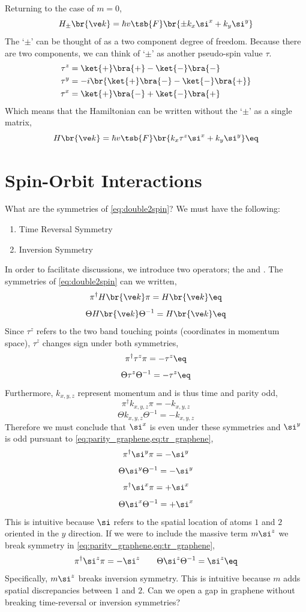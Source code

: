 \documentclass{article}
\begin{document}
Returning to the case of $m=0$,
\[ H_{\pm}\br{\ve k} =\hbar v\tsb{F} \br{\pm k_x \si^x + k_y \si^{y}} \]
The `$\pm$' can be thought of as a two component degree of freedom. Because there are two components, we can think of `$\pm$' as another pseudo-spin value $\tau$.
\begin{align*}
    \tau^{z} &= \ket{+} \bra{+} - \ket{-}\bra{-} \\
    \tau^{y} &= -i\br{\ket{+} \bra{-} - \ket{-}\bra{+}} \\
    \tau^{x} &= \ket{+} \bra{-} + \ket{-}\bra{+}
\end{align*}
Which means that the Hamiltonian can be written without the `$\pm$' as a single matrix,
\[ H\br{\ve k} =\hbar v\tsb{F} \br{k_x \tau^{z} \si^x + k_y \si^{y}} \eq \label{eq:double2spin}\]
\section{Spin-Orbit Interactions}
What are the symmetries of \cref{eq:double2spin}? We must have the following:
\begin{enumerate}
    \item Time Reversal Symmetry
    \item Inversion Symmetry
\end{enumerate}
In order to facilitate discussions, we introduce two operators; the  and . The symmetries of \cref{eq:double2spin} can we written,
\[  \pi^{\dagger} H\br{\ve k} \pi = H\br{\ve k} \eq \label{eq:parity_graphene}\]
\[  \Theta H\br{\ve k} \Theta^{-1} = H\br{\ve k} \eq \label{eq:tr_graphene}\]
Since $\tau^{z}$ refers to the two band touching points (coordinates in momentum space), $\tau^{z}$ changes sign under both symmetries,
\[ \pi^{\dagger} \tau^{z} \pi = - \tau^{z} \eq \label{eq:tau_z_sym_parity}\]
\[ \Theta \tau^{z} \Theta^{-1} = - \tau^{z} \eq \label{eq:tau_z_sym_tr}\]
Furthermore, $k_{x, y, z}$ represent momentum and is thus time and parity odd,
\[ \pi^{\dagger} k_{x,y,z} \pi = - k_{x,y,z} \]
\[ \Theta k_{x,y,z} \Theta^{-1} = - k_{x,y,z} \]
Therefore we must conclude that $\si^{x}$ is even under these symmetries and $\si^{y}$ is odd pursuant to \cref{eq:parity_graphene,eq:tr_graphene},
\[ \pi^{\dagger} \si^{y} \pi = - \si^{y} \]
\[ \Theta \si^{y} \Theta^{-1} = - \si^{y} \]
\[ \pi^{\dagger} \si^{x} \pi = + \si^{x} \]
\[ \Theta \si^{x} \Theta^{-1} = + \si^{x} \]
This is intuitive because $\si$ refers to the spatial location of atoms $1$ and $2$ oriented in the $y$ direction.
If we were to include the massive term $m\si^{z}$ we break symmetry in \cref{eq:parity_graphene,eq:tr_graphene},
\[ \pi^{\dagger} \si^{z} \pi = - \si^{z} \qquad \Theta \si^{z} \Theta^{-1} = \si^{z} \eq \label{eq:si_z_sym}\]
Specifically, $m \si^{z}$ breaks inversion symmetry. This is intuitive because $m$ adds spatial discrepancies between $1$ and $2$. Can we open a gap in graphene without breaking time-reversal or inversion symmetries?\\
\end{document}
